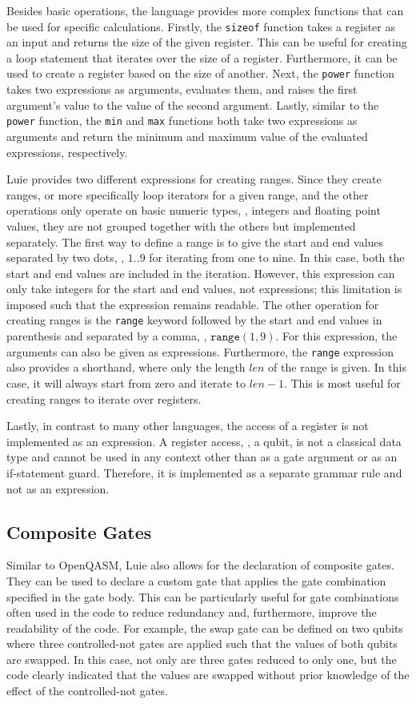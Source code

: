 Besides basic operations, the language provides more complex functions that can be used for specific calculations. Firstly, the \texttt{sizeof} function takes a register as an input and returns the size of the given register. This can be useful for creating a loop statement that iterates over the size of a register. Furthermore, it can be used to create a register based on the size of another. Next, the \texttt{power} function takes two expressions as arguments, evaluates them, and raises the first argument's value to the value of the second argument. Lastly, similar to the \texttt{power} function, the \texttt{min} and \texttt{max} functions both take two expressions as arguments and return the minimum and maximum value of the evaluated expressions, respectively.

Luie provides two different expressions for creating ranges. Since they create ranges, or more specifically loop iterators for a given range, and the other operations only operate on basic numeric types, \eg, integers and floating point values, they are not grouped together with the others but implemented separately. The first way to define a range is to give the start and end values separated by two dots, \eg, $1\texttt{..}9$ for iterating from one to nine. In this case, both the start and end values are included in the iteration. However, this expression can only take integers for the start and end values, not expressions; this limitation is imposed such that the expression remains readable. The other operation for creating ranges is the \texttt{range} keyword followed by the start and end values in parenthesis and separated by a comma, \eg, $\texttt{range}(1, 9)$. For this expression, the arguments can also be given as expressions. Furthermore, the \texttt{range} expression also provides a shorthand, where only the length $len$ of the range is given. In this case, it will always start from zero and iterate to $len - 1$. This is most useful for creating ranges to iterate over registers. 

Lastly, in contrast to many other languages, the access of a register is not implemented as an expression. A register access, \ie, a qubit, is not a classical data type and cannot be used in any context other than as a gate argument or as an if-statement guard. Therefore, it is implemented as a separate grammar rule and not as an expression.

\subsection{Composite Gates}
\label{sec:concept_compositeGates}
Similar to OpenQASM, Luie also allows for the declaration of composite gates. They can be used to declare a custom gate that applies the gate combination specified in the gate body. This can be particularly useful for gate combinations often used in the code to reduce redundancy and, furthermore, improve the readability of the code. For example, the swap gate can be defined on two qubits where three controlled-not gates are applied such that the values of both qubits are swapped. In this case, not only are three gates reduced to only one, but the code clearly indicated that the values are swapped without prior knowledge of the effect of the controlled-not gates.

